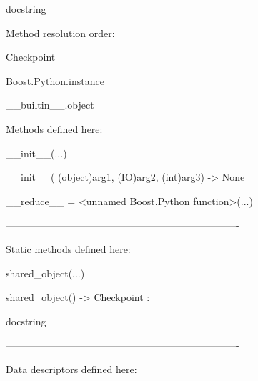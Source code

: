 \documentclass[letterpaper,10pt,english]{sphinxmanual}
\begin{document}
\begin{description}
\begin{description}
\item[{class Checkpoint(Boost.Python.instance)}] \leavevmode
\begin{DUlineblock}{0em}
\item[] docstring
\item[] 
\item[] Method resolution order:
\item[]
\begin{DUlineblock}{\DUlineblockindent}
\item[] Checkpoint
\item[] Boost.Python.instance
\item[] \_\_builtin\_\_.object
\item[] 
\end{DUlineblock}
\item[] Methods defined here:
\item[] 
\item[] \_\_init\_\_(...)
\item[]
\begin{DUlineblock}{\DUlineblockindent}
\item[] \_\_init\_\_( (object)arg1, (IO)arg2, (int)arg3) -\textgreater{} None
\item[] 
\end{DUlineblock}
\item[] \_\_reduce\_\_ = \textless{}unnamed Boost.Python function\textgreater{}(...)
\item[] 
\item[] ----------------------------------------------------------------------
\item[] Static methods defined here:
\item[] 
\item[] shared\_object(...)
\item[]
\begin{DUlineblock}{\DUlineblockindent}
\item[] shared\_object() -\textgreater{} Checkpoint :
\item[]
\begin{DUlineblock}{\DUlineblockindent}
\item[] docstring
\item[] 
\end{DUlineblock}
\end{DUlineblock}
\item[] ----------------------------------------------------------------------
\item[] Data descriptors defined here:
\item[] 

\end{DUlineblock}
\end{description}
\end{description}
\end{document}
